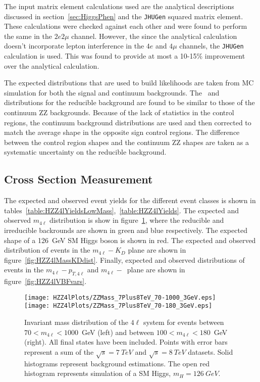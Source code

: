 The input matrix element calculations used are the 
analytical descriptions discussed in section~\ref{sec:HiggsPhen}
and the \verb+JHUGen+ squared matrix element.  These calculations
were checked against each other and were found to perform the 
same in the $2e2\mu$ channel.  However, the since the analytical
calculation doesn't incorporate lepton interference in the 
$4e$ and $4\mu$ channels, the \verb+JHUGen+ calculation is used. 
This was found to provide at most a 10-15\% improvement over the 
analytical calculation. 

The expected distributions that are used to build likelihoods
are taken from MC simulation for both the signal and continuum
backgrounds.  The \KD~and \spinKD distributions for the reducible
background are found to be similar to those of the continuum ZZ
backgrounds.  Because of the lack of statistics in the control
regions, the continuum background distributions are used and then
corrected to match the average shape in the opposite sign control 
regions.  The difference between the control region shapes and the
continuum ZZ shapes are taken as a systematic uncertainty on the
reducible background.   

\subsection{Cross Section Measurement}
\label{sec:HZZ4lxsec}

The expected and observed event yields for the different event 
classes is shown in tables~\ref{table:HZZ4lYieldsLowMass},~\ref{table:HZZ4lYields}.  
The expected and observed $m_{4\ell}$ distribution is show in 
figure~\ref{fig:HZZ4lMassDistribution},
where the reducible and irreducible backrounds are shown in green
and blue respectively.  The expected shape of a 126~GeV SM Higgs
boson is shown in red.  The expected and observed distribution of 
events in the 
$m_{4\ell}-K_D$ plane are shown in figure~\ref{fig:HZZ4lMassKDdist}.
Finally, expected and observed distributions of events in the 
$m_{4\ell}-p_{T,4\ell}$ and $m_{4\ell}-$\Djet~plane are 
shown in figure~\ref{fig:HZZ4lVBFvars}. 

\begin{figure}
\begin{center}
\texttt{[image: HZZ4lPlots/ZZMass\_7Plus8TeV\_70-1000\_3GeV.eps]}
\texttt{[image: HZZ4lPlots/ZZMass\_7Plus8TeV\_70-180\_3GeV.eps]}
\caption{Invariant mass distribution of the $4\ell$ system for
events between $70<m_{4\ell}<1000$~GeV (left) and between
$100<m_{4\ell}<180$~GeV (right).  All final states have been included.  
Points with error bars represent a sum of the $\sqrt{s}=7~TeV$
and $\sqrt{s}=8~TeV$ datasets.  Solid histograms represent
background estimations.  The open red histogram represents
simulation of a SM Higgs, $m_H=126~GeV$.}
\label{fig:HZZ4lMassDistribution}
\end{center}
\end{figure}

